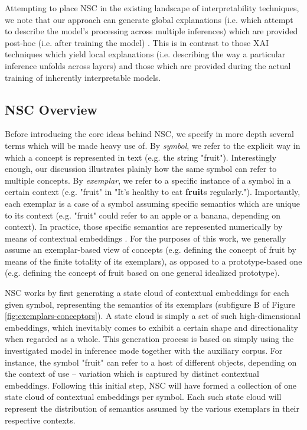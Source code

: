 Attempting to place NSC in the existing landscape of interpretability techniques, we note that our approach can generate global explanations (i.e. which attempt to describe the model's processing across multiple inferences) which are provided post-hoc (i.e. after training the model) \citep{danilevsky_survey_nodate}. This is in contrast to those XAI techniques which yield local explanations (i.e. describing the way a particular inference unfolds across layers) and those which are provided during the actual training of inherently interpretable models.

\subsection{NSC Overview}

Before introducing the core ideas behind NSC, we specify in more depth several terms which will be made heavy use of. By \textit{symbol}, we refer to the explicit way in which a concept is represented in text (e.g. the string "fruit"). Interestingly enough, our discussion illustrates plainly how the same symbol can refer to multiple concepts. By \textit{exemplar}, we refer to a specific instance of a symbol in a certain context (e.g. "fruit" in "It's healthy to eat \textbf{fruit}s regularly."). Importantly, each exemplar is a case of a symbol assuming specific semantics which are unique to its context (e.g. "fruit" could refer to an apple or a banana, depending on context). In practice, those specific semantics are represented numerically by means of contextual embeddings \citep{devlin_bert_nodate}. For the purposes of this work, we generally assume an exemplar-based view of concepts (e.g. defining the concept of fruit by means of the finite totality of its exemplars), as opposed to a prototype-based one (e.g. defining the concept of fruit based on one general idealized prototype).

NSC works by first generating a state cloud of contextual embeddings for each given symbol, representing the semantics of its exemplars (subfigure B of Figure \ref{fig:exemplars-conceptors}). A state cloud is simply a set of such high-dimensional embeddings, which inevitably comes to exhibit a certain shape and directionality when regarded as a whole. This generation process is based on simply using the investigated model in inference mode together with the auxiliary corpus. For instance, the symbol "fruit" can refer to a host of different objects, depending on the context of use -- variation which is captured by distinct contextual embeddings. Following this initial step, NSC will have formed a collection of one state cloud of contextual embeddings per symbol. Each such state cloud will represent the distribution of semantics assumed by the various exemplars in their respective contexts.

